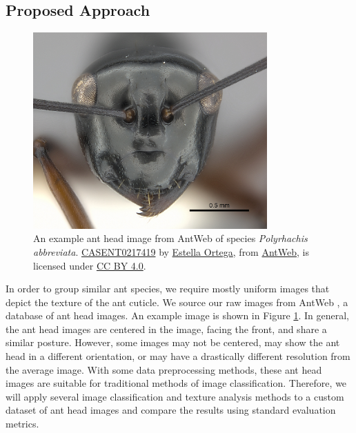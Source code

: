 \documentclass[12pt]{article}
\begin{document}
\subsection{Proposed Approach}

\begin{figure}
    \centering
    \includegraphics[width=0.8\textwidth]{assets/images/CASENT0217419.jpg}
    \caption{ An example ant head image from AntWeb of species
        \textit{Polyrhachis abbreviata}.
        \href{https://www.antweb.org/bigPicture.do?name=casent0217419&shot=h&number=1}{CASENT0217419}
        by \href{https://www.antweb.org/artist.do?id=92}{Estella Ortega}, from
        \href{https://www.antweb.org}{AntWeb}, is licensed under
        \href{https://creativecommons.org/licenses/by/4.0/}{CC BY 4.0}.}
    \label{fig:CASENT0217419}
\end{figure}

In order to group similar ant species, we require mostly uniform images that
depict the texture of the ant cuticle. We source our raw images from AntWeb
\cite{perrichot_antweb_2012}, a database of ant head images. An example image is
shown in Figure \ref{fig:CASENT0217419}. In general, the ant head images are
centered in the image, facing the front, and share a similar posture. However,
some images may not be centered, may show the ant head in a different
orientation, or may have a drastically different resolution from the average
image. With some data preprocessing methods, these ant head images are suitable
for traditional methods of image classification. Therefore, we will apply
several image classification and texture analysis methods to a custom dataset of
ant head images and compare the results using standard evaluation metrics.
\end{document}
